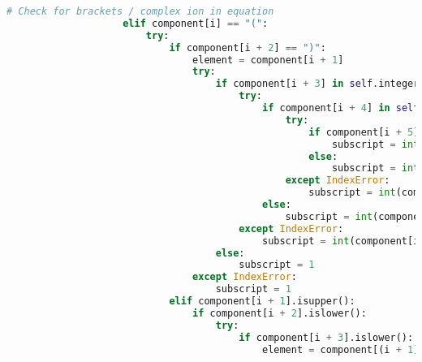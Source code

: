 \documentclass[a4paper,12pt]{article}
\begin{document}
\begin{lstlisting}[language=Python, caption=parseComponent method for finding elements, label={lst:parsecomponent}]
                    # Check for brackets / complex ion in equation
                    elif component[i] == "(":
                        try:
                            if component[i + 2] == ")":
                                element = component[i + 1]
                                try:
                                    if component[i + 3] in self.integers:
                                        try:
                                            if component[i + 4] in self.integers:
                                                try:
                                                    if component[i + 5] in self.integers:
                                                        subscript = int(component[(i + 3): (i + 6)])
                                                    else:
                                                        subscript = int(component[(i + 3): (i + 5)])
                                                except IndexError:
                                                    subscript = int(component[(i + 3): (i + 5)])
                                            else:
                                                subscript = int(component[(i + 3): (i + 4)])
                                        except IndexError:
                                            subscript = int(component[i + 3])
                                    else:
                                        subscript = 1
                                except IndexError:
                                    subscript = 1
                            elif component[i + 1].isupper():
                                if component[i + 2].islower():
                                    try:
                                        if component[i + 3].islower():
                                            element = component[(i + 1): (i + 4)]


\end{lstlisting}
\end{document}
